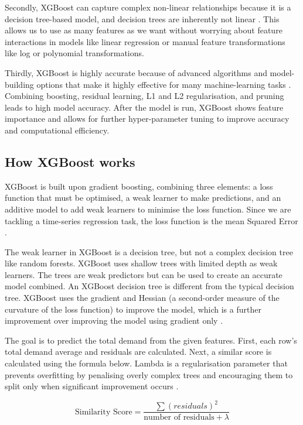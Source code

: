 \documentclass[mstat,12pt]{unswthesis}
\begin{document}
Secondly, XGBoost can capture complex non-linear relationships because
it is a decision tree-based model, and decision trees are inherently not
linear \cite{ambika_2023_xgboost}. This allows us to use as many
features as we want without worrying about feature interactions in
models like linear regression or manual feature transformations like log
or polynomial transformations.

Thirdly, XGBoost is highly accurate because of advanced algorithms and
model-building options that make it highly effective for many
machine-learning tasks \cite{ambika_2023_xgboost}. Combining boosting,
residual learning, L1 and L2 regularisation, and pruning leads to high
model accuracy. After the model is run, XGBoost shows feature importance
and allows for further hyper-parameter tuning to improve accuracy and
computational efficiency.

\subsection{How XGBoost works}\label{how-xgboost-works}

XGBoost is built upon gradient boosting, combining three elements: a
loss function that must be optimised, a weak learner to make
predictions, and an additive model to add weak learners to minimise the
loss function. Since we are tackling a time-series regression task, the
loss function is the mean Squared Error
\cite{brownlee_gradientboosting2020}.

The weak learner in XGBoost is a decision tree, but not a complex
decision tree like random forests. XGBoost uses shallow trees with
limited depth as weak learners. The trees are weak predictors but can be
used to create an accurate model combined. An XGBoost decision tree is
different from the typical decision tree. XGBoost uses the gradient and
Hessian (a second-order measure of the curvature of the loss function)
to improve the model, which is a further improvement over improving the
model using gradient only \cite{chen_2016_xgboost}.

The goal is to predict the total demand from the given features. First,
each row's total demand average and residuals are calculated. Next, a
similar score is calculated using the formula below. Lambda is a
regularisation parameter that prevents overfitting by penalising overly
complex trees and encouraging them to split only when significant
improvement occurs \cite{chen_2016_xgboost}.

\[
\text{Similarity Score} = \frac{\sum{(residuals)}^2 }{\text{number of residuals} + \lambda}
\]
\end{document}
